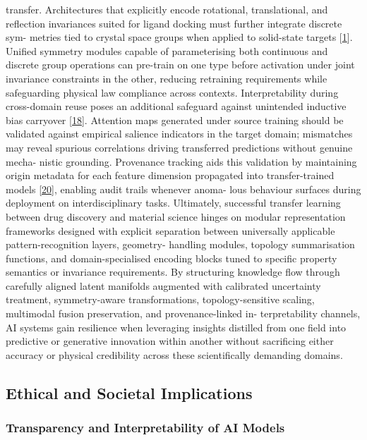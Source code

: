 \documentclass[
]{article}
\begin{document}
transfer. Architectures that explicitly encode rotational,
translational, and reflection invariances suited for ligand docking must
further integrate discrete sym- metries tied to crystal space groups
when applied to solid-state targets {[}\hyperref[_bookmark41]{1}{]}.
Unified symmetry modules capable of parameterising both continuous and
discrete group operations can pre-train on one type before activation
under joint invariance constraints in the other, reducing retraining
requirements while safeguarding physical law compliance across contexts.
Interpretability during cross-domain reuse poses an additional safeguard
against unintended inductive bias carryover
{[}\hyperref[_bookmark58]{18}{]}. Attention maps generated under source
training should be validated against empirical salience indicators in
the target domain; mismatches may reveal spurious correlations driving
transferred predictions without genuine mecha- nistic grounding.
Provenance tracking aids this validation by maintaining origin metadata
for each feature dimension propagated into transfer-trained models
{[}\hyperref[_bookmark60]{20}{]}, enabling audit trails whenever anoma-
lous behaviour surfaces during deployment on interdisciplinary tasks.
Ultimately, successful transfer learning between drug discovery and
material science hinges on modular representation frameworks designed
with explicit separation between universally applicable
pattern-recognition layers, geometry- handling modules, topology
summarisation functions, and domain-specialised encoding blocks tuned to
specific property semantics or invariance requirements. By structuring
knowledge flow through carefully aligned latent manifolds augmented with
calibrated uncertainty treatment, symmetry-aware transformations,
topology-sensitive scaling, multimodal fusion preservation, and
provenance-linked in- terpretability channels, AI systems gain
resilience when leveraging insights distilled from one field into
predictive or generative innovation within another without sacrificing
either accuracy or physical credibility across these scientifically
demanding domains.

\subsection{Ethical and Societal
Implications}\label{ethical-and-societal-implications}

\subsubsection{Transparency and Interpretability of AI
Models}\label{transparency-and-interpretability-of-ai-models}
\end{document}
